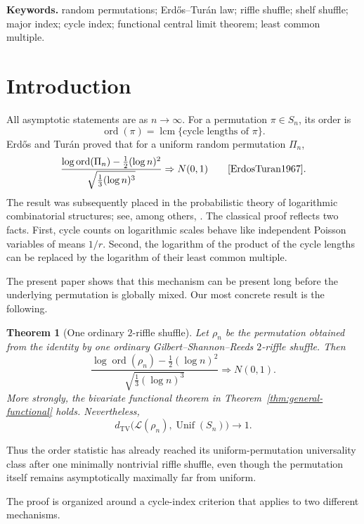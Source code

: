 \documentclass[11pt]{article}
\newtheorem{theorem}{Theorem}[section]
\theoremstyle{definition}
\theoremstyle{remark}
\newcommand{\ord}{\operatorname{ord}}
\newcommand{\lcm}{\operatorname{lcm}}
\newcommand{\TV}{\mathrm{TV}}
\newcommand{\cL}{\mathcal L}
\begin{document}
\smallskip
\noindent\textbf{Keywords.}
random permutations; Erd\H{o}s--Tur\'an law; riffle shuffle; shelf shuffle;
major index; cycle index; functional central limit theorem; least common
multiple.

\tableofcontents

\section{Introduction}

All asymptotic statements are as $n\to\infty$.  For a permutation $\pi\in S_n$, its order is
\[
 \ord(\pi)=\lcm\{\text{cycle lengths of }\pi\}.
\]
Erd\H{o}s and Tur\'an proved that for a uniform random permutation
$\Pi_n$,
\[
 \frac{\log\ord(\Pi_n)-\frac12(\log n)^2}
 {\sqrt{\frac13(\log n)^3}}
 \Rightarrow N(0,1)
 \qquad\text{\cite{ErdosTuran1967}.}
\]
The result was subsequently placed in the probabilistic theory of
logarithmic combinatorial structures; see, among others,
\cite{ArratiaTavare1992,ABT2003,BarbourTavare1994}.  The classical proof
reflects two facts.  First, cycle counts on logarithmic scales behave like
independent Poisson variables of means $1/r$.  Second, the logarithm of the
product of the cycle lengths can be replaced by the logarithm of their
least common multiple.

The present paper shows that this mechanism can be present long before the
underlying permutation is globally mixed.  Our most concrete result is the
following.

\begin{theorem}[One ordinary $2$-riffle shuffle]\label{thm:headline}
Let $\rho_n$ be the permutation obtained from the identity by one ordinary
Gilbert--Shannon--Reeds $2$-riffle shuffle.  Then
\[
 \frac{\log\ord(\rho_n)-\frac12(\log n)^2}
 {\sqrt{\frac13(\log n)^3}}
 \Rightarrow N(0,1).
\]
More strongly, the bivariate functional theorem in
Theorem~\ref{thm:general-functional} holds.  Nevertheless,
\[
 d_{\TV}\bigl(\cL(\rho_n),\operatorname{Unif}(S_n)\bigr)\longrightarrow1.
\]
\end{theorem}

Thus the order statistic has already reached its uniform-permutation
universality class after one minimally nontrivial riffle shuffle, even
though the permutation itself remains asymptotically maximally far from
uniform.

The proof is organized around a cycle-index criterion that applies to two
different mechanisms.
\end{document}
